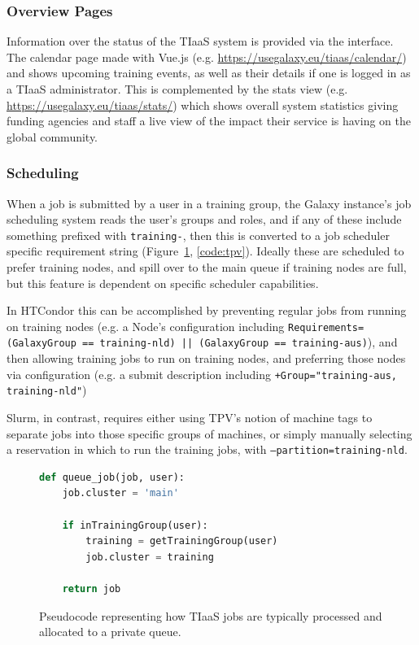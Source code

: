 \documentclass[a4paper,num-refs]{oup-contemporary}
\begin{document}
\subsubsection{Overview Pages}
Information over the status of the TIaaS system is provided via the interface. The calendar page made with Vue.js \cite{Vue} (e.g. \url{https://usegalaxy.eu/tiaas/calendar/}) and shows upcoming training events, as well as their details if one is logged in as a TIaaS administrator. This is complemented by the stats view (e.g. \url{https://usegalaxy.eu/tiaas/stats/}) which shows overall system statistics giving funding agencies and staff a live view of the impact their service is having on the global community.

\subsubsection{Scheduling}
When a job is submitted by a user in a training group, the Galaxy instance's job scheduling system reads the user's groups and roles, and if any of these include something prefixed with \texttt{training-}, then this is converted to a job scheduler specific requirement string (Figure~\ref{code:scheduler}, \ref{code:tpv}). Ideally these are scheduled to prefer training nodes, and spill over to the main queue if training nodes are full, but this feature is dependent on specific scheduler capabilities.

In HTCondor this can be accomplished by preventing regular jobs from running on training nodes (e.g. a Node's configuration including \texttt{Requirements=(GalaxyGroup == training-nld) || (GalaxyGroup == training-aus)}), and then allowing training jobs to run on training nodes, and preferring those nodes via configuration (e.g. a submit description including \texttt{+Group="training-aus, training-nld"})

Slurm, in contrast, requires either using TPV's notion of machine tags to separate jobs into those specific groups of machines, or simply manually selecting a reservation in which to run the training jobs, with \texttt{--partition=training-nld}.

\begin{figure}[!ht]
\centering
\begin{lstlisting}[frame=single,language=Python]
def queue_job(job, user):
    job.cluster = 'main'

    if inTrainingGroup(user):
        training = getTrainingGroup(user)
        job.cluster = training

    return job
\end{lstlisting}
\caption{Pseudocode representing how TIaaS jobs are typically processed and allocated to a private queue.\label{code:scheduler}}
\end{figure}
\end{document}
